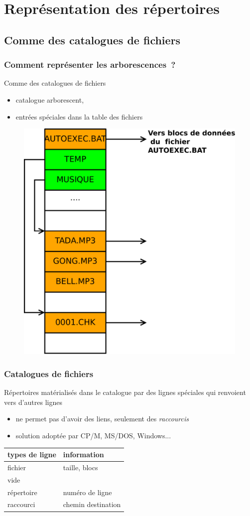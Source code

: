 \section{Représentation des répertoires}
\subsection{Comme des catalogues de fichiers}
\begin{frame}
  \frametitle{Comment représenter les arborescences~?}
  
   Comme des catalogues de fichiers
  \begin{itemize}
  \item catalogue arborescent, 
  \item entrées spéciales dans la table des fichiers
  \end{itemize}
  \begin{figure}
    \includegraphics[width=0.4\linewidth]{fig4/repertoires}
  \end{figure}
\end{frame}

\begin{frame}
  \frametitle{Catalogues de fichiers}
  Répertoires matérialisés dans le catalogue par des lignes spéciales qui
  renvoient vers d'autres lignes
  \begin{itemize}
  \item ne permet pas d'avoir des liens, seulement des \emph{raccourcis}
  \item solution adoptée par CP/M, MS/DOS, Windows...
  \end{itemize}
  
  \begin{tabular}{|ll|}
    \hline
    \alert{types de ligne} & information\\
    \hline \hline 
    fichier & taille, blocs \\ \hline vide & \\ \hline répertoire & numéro de
    ligne \\ \hline raccourci & chemin destination \\ \hline
  \end{tabular}
\end{frame}

